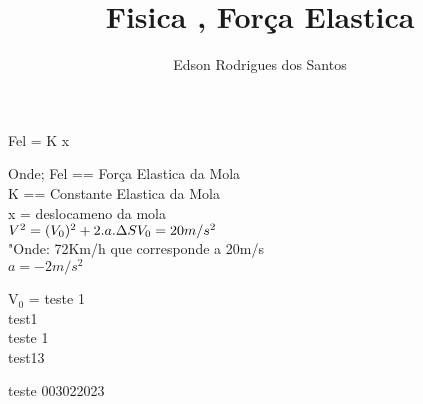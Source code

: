 \documentclass[12pt, a4paper]{article}
\title{Fisica , Força Elastica}
\author{Edson Rodrigues dos Santos}
\begin{document}
\maketitle

Fel = K x

Onde;
Fel == Força Elastica da Mola\\
K == Constante Elastica da Mola\\
x = deslocameno da mola\\

\noindent 
$
V^2 = (V_0 )^2 + 2.a.\Delta S
\\
V_0 = 20m/s^2 $
\\
"Onde: 72Km/h que corresponde a 20m/s\\
$a =-2m/s^2$


V$_0$ = 
teste 1\\
test1\\

\noindent
teste 1\\
test13

teste 003022023
\end{document}
